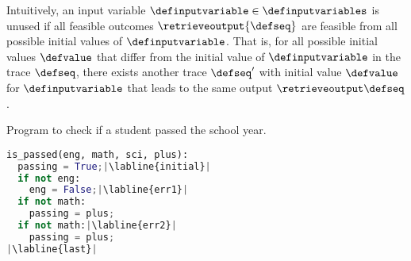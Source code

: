 Intuitively, an input variable $\definputvariable\in \definputvariables$ is unused if all feasible outcomes $\retrieveoutput{\defseq}$ are feasible from all possible initial values of $\definputvariable$.
That is, for all possible initial values $\defvalue$ that differ from the initial value of $\definputvariable$ in the trace $\defseq$, there exists another trace $\defseq'$ with initial value $\defvalue$ for $\definputvariable$ that leads to the same output $\retrieveoutput\defseq$.

\begin{marginlisting}[*-3]
  \caption{Program to check if a student passed the school year.}
  \vspace{2\lineheight}
\begin{lstlisting}[style=mystyle,language=Python,escapechar=|]
is_passed(eng, math, sci, plus):
  passing = True;|\labline{initial}|
  if not eng:
    eng = False;|\labline{err1}|
  if not math:
    passing = plus;
  if not math:|\labline{err2}|
    passing = plus;
|\labline{last}|
\end{lstlisting}
\end{marginlisting}

